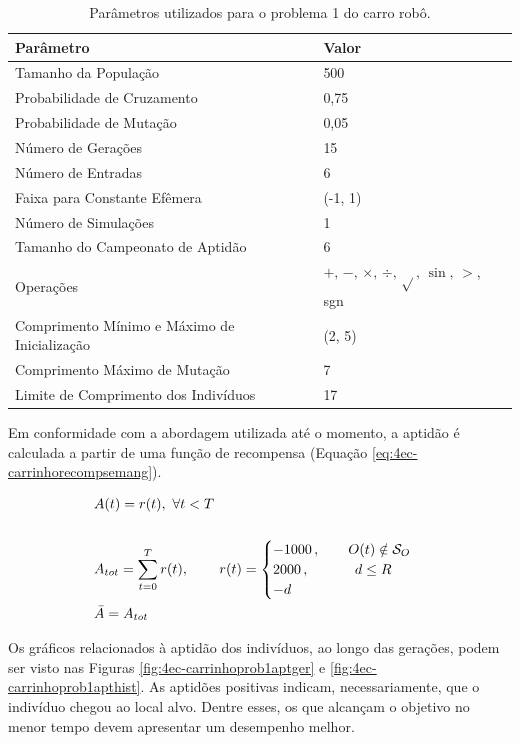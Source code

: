 \begin{table}[H]
	\centering
	\begin{tabular}{l|l} \toprule
		{Parâmetro} & {Valor} \\ \midrule
		{Tamanho da População} & {500} \\
		{Probabilidade de Cruzamento} & {0,75} \\
		{Probabilidade de Mutação} & {0,05} \\
		{Número de Gerações} & {15} \\
		{Número de Entradas} & {6} \\
		{Faixa para Constante Efêmera} & {(-1, 1)} \\
		{Número de Simulações} & {1} \\
		{Tamanho do Campeonato de Aptidão} & {6} \\
		{Operações} & {$+,\,-,\,\times,\,\div,\,\sqrt{},\,\sin,\,>$, sgn} \\
		{Comprimento Mínimo e Máximo de Inicialização} & {(2, 5)} \\
		{Comprimento Máximo de Mutação} & {7} \\
		{Limite de Comprimento dos Indivíduos} & {17} \\
		\bottomrule
	\end{tabular}
	\caption{Parâmetros utilizados para o problema 1 do carro robô.}\label{tab:4ec-carrinhoprob1parampg}
\end{table}

Em conformidade com a abordagem utilizada até o momento, a aptidão é calculada a partir de uma função de recompensa (Equação \ref{eq:4ec-carrinhorecompsemang}).

\begin{align}\label{eq:4ec-carrinhoprob1aptidao}
\begin{split}
&A(t) = r(t),\,\,\forall t<T\\\\
&A_{tot} = \sum_{t=0}^{T} r(t),\,\qquad r(t) =
\begin{cases}
-1000\,,\qquad O(t)\notin\mathcal{S}_O\\
2000\,,\qquad\hspace{1.25em} d\le R\\
-d
\end{cases} \\
&\bar{A} = A_{tot}
\end{split}
\end{align}

Os gráficos relacionados à aptidão dos indivíduos, ao longo das gerações, podem ser visto nas Figuras \ref{fig:4ec-carrinhoprob1aptger} e \ref{fig:4ec-carrinhoprob1apthist}. As aptidões positivas indicam, necessariamente, que o indivíduo chegou ao local alvo. Dentre esses, os que alcançam o objetivo no menor tempo devem apresentar um desempenho melhor.

